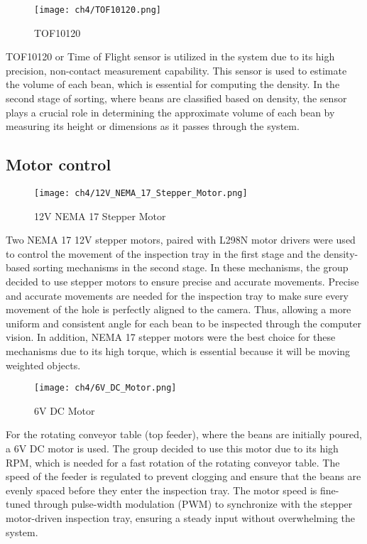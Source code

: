 \begin{figure}[H]
    \centering
    \texttt{[image: ch4/TOF10120.png]} %
    \caption{TOF10120}
    \label{fig:tof10120}
\end{figure}

TOF10120 or Time of Flight sensor is utilized in the system due to its high precision, non-contact measurement capability. This sensor is used to estimate the volume of each bean, which is essential for computing the density. In the second stage of sorting, where beans are classified based on density, the sensor plays a crucial role in determining the approximate volume of each bean by measuring its height or dimensions as it passes through the system.

\subsection{Motor control}

\begin{figure}[H]
    \centering
    \texttt{[image: ch4/12V\_NEMA\_17\_Stepper\_Motor.png]} %
    \caption{12V NEMA 17 Stepper Motor}
    \label{fig:stepper_motor}
\end{figure}

Two NEMA 17 12V stepper motors, paired with L298N motor drivers were used to control the movement of the inspection tray in the first stage and the density-based sorting mechanisms in the second stage. In these mechanisms, the group decided to use stepper motors to ensure precise and accurate movements. Precise and accurate movements are needed for the inspection tray to make sure every movement of the hole is perfectly aligned to the camera. Thus, allowing a more uniform and consistent angle for each bean to be inspected through the computer vision. In addition, NEMA 17 stepper motors were the best choice for these mechanisms due to its high torque, which is essential because it will be moving weighted objects. 

\begin{figure}[H]
    \centering
    \texttt{[image: ch4/6V\_DC\_Motor.png]} %
    \caption{6V DC Motor}
    \label{fig:6v_dc_motor}
\end{figure}

For the rotating conveyor table (top feeder), where the beans are initially poured, a 6V DC motor is used. The group decided to use this motor due to its high RPM, which is needed for a fast rotation of the rotating conveyor table. The speed of the feeder is regulated to prevent clogging and ensure that the beans are evenly spaced before they enter the inspection tray. The motor speed is fine-tuned through pulse-width modulation (PWM) to synchronize with the stepper motor-driven inspection tray, ensuring a steady input without overwhelming the system.

